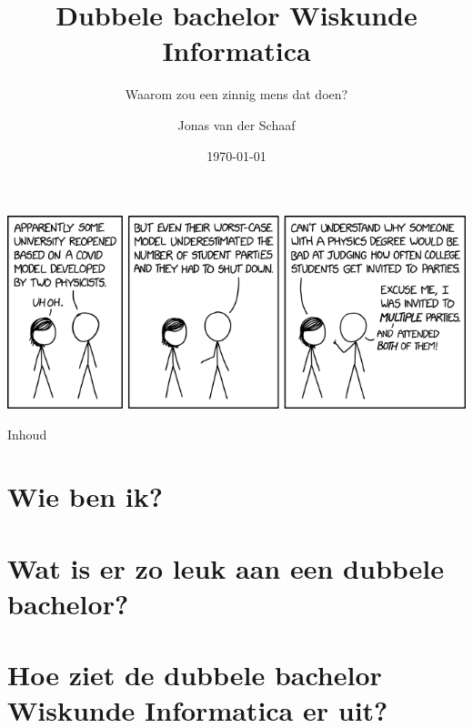 \documentclass{beamer}
\title{Dubbele bachelor Wiskunde Informatica}
\subtitle{Waarom zou een zinnig mens dat doen?}
\author{Jonas van der Schaaf}
\institute[UvA]{Universiteit van Amsterdam}
\date{\today}
\begin{document}
\begin{frame}
    \begin{center}
        \includegraphics[scale=0.45]{assets/xkcd_parties.png}
    \end{center}
\end{frame}

\begin{frame}
    \maketitle
\end{frame}

\begin{frame}{Inhoud}
    \tableofcontents
\end{frame}

\section{Wie ben ik?}

\section{Wat is er zo leuk aan een dubbele bachelor?}

\section{Hoe ziet de dubbele bachelor Wiskunde Informatica er uit?}
\end{document}
